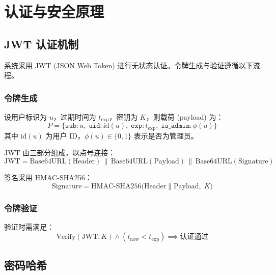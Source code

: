 \documentclass[12pt,a4paper]{article}
\begin{document}
\section{认证与安全原理}

\subsection{JWT 认证机制}

系统采用 JWT (JSON Web Token) 进行无状态认证。令牌生成与验证遵循以下流程。

\subsubsection{令牌生成}

设用户标识为 $u$，过期时间为 $t_{\exp}$，密钥为 $K$，则载荷 (payload) 为：
\begin{equation}
P = \{ \mathtt{sub}: u,\; \mathtt{uid}: \mathrm{id}(u),\; \mathtt{exp}: t_{\exp},\; \mathtt{is\_admin}: \phi(u) \}
\end{equation}
其中 $\mathrm{id}(u)$ 为用户 ID，$\phi(u) \in \{0,1\}$ 表示是否为管理员。

JWT 由三部分组成，以点号连接：
\begin{equation}
\mathrm{JWT} = \mathrm{Base64URL}(\mathrm{Header}) \,\|\, \mathrm{Base64URL}(\mathrm{Payload}) \,\|\, \mathrm{Base64URL}(\mathrm{Signature})
\end{equation}

签名采用 HMAC-SHA256：
\begin{equation}
\mathrm{Signature} = \mathrm{HMAC}\text{-}\mathrm{SHA256}\bigl( \mathrm{Header} \| \mathrm{Payload},\; K \bigr)
\end{equation}

\subsubsection{令牌验证}

验证时需满足：
\begin{equation}
\mathrm{Verify}(\mathrm{JWT}, K) \land (t_{\mathrm{now}} < t_{\exp}) \implies \text{认证通过}
\end{equation}

\subsection{密码哈希}
\end{document}
